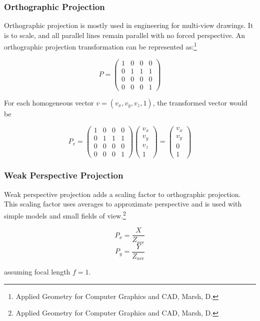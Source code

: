 \documentclass{article}
\begin{document}
\subsubsection{Orthographic Projection}
Orthographic projection is mostly used in engineering for multi-view drawings. It is to scale, and all parallel lines remain parallel with no forced perspective. An orthographic projection transformation can be represented as:\footnote{Applied Geometry for Computer Graphics and CAD, Marsh, D.}

\[ P = \begin{pmatrix}
  1 & 0 & 0 & 0 \\
  0 & 1 & 1 & 1 \\ 
  0 & 0 & 0 & 0 \\
  0 & 0 & 0 & 1 
\end{pmatrix}\]	


For each homogeneous vector $v = (v_{x}, v_{y}, v_{z}, 1)$, the transformed vector would be

\[P_{v} = \begin{pmatrix}
  1 & 0 & 0 & 0 \\
  0 & 1 & 1 & 1 \\
  0 & 0 & 0 & 0 \\
  0 & 0 & 0 & 1 
 \end{pmatrix}	
\begin{pmatrix}
  v_{x} \\
  v_{y} \\
  v_{z} \\
  1
 \end{pmatrix}	
=
\begin{pmatrix}
  v_{x} \\
  v_{y} \\
  0 \\
  1
 \end{pmatrix}\]

\subsubsection{Weak Perspective Projection}
Weak perspective projection adds a scaling factor to orthographic projection. This scaling factor uses averages to approximate perspective and is used with simple models and small fields of view.\footnote{Applied Geometry for Computer Graphics and CAD, Marsh, D.}

  \[P_{x} =  \frac{X}{Z_{ave}}\]
  \[P_{y} =  \frac{Y}{Z_{ave}}\]

assuming focal length $f = 1$.
\end{document}
